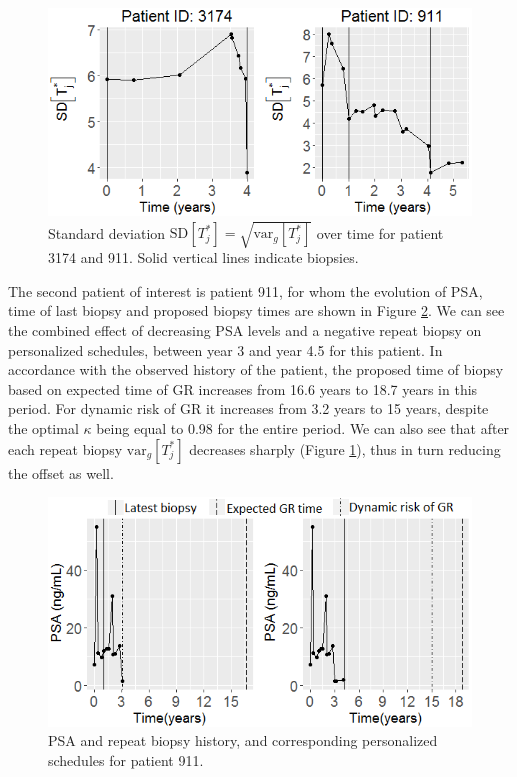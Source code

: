 \begin{figure}
\centerline{\includegraphics[width=\columnwidth]{images/prias_demo/variance_3174_911.png}}
\caption{Standard deviation $\mbox{SD}[T^*_j] = \sqrt{\mbox{var}_g[T^*_j]}$ over time for patient 3174 and 911. Solid vertical lines indicate biopsies.}
\label{fig : variance_pred_dist_3174_911}
\end{figure}

The second patient of interest is patient 911, for whom the evolution of PSA, time of last biopsy and proposed biopsy times are shown in Figure \ref{fig : prias_demo_pid_911}. We can see the combined effect of decreasing PSA levels and a negative repeat biopsy on personalized schedules, between year 3 and year 4.5 for this patient. In accordance with the observed history of the patient, the proposed time of biopsy based on expected time of GR increases from 16.6 years to 18.7 years in this period. For dynamic risk of GR it increases from 3.2 years to 15 years, despite the optimal $\kappa$ being equal to 0.98 for the entire period. We can also see that after each repeat biopsy $\mbox{var}_g[T^*_j]$ decreases sharply (Figure \ref{fig : variance_pred_dist_3174_911}), thus in turn reducing the offset as well.

\begin{figure}
\centerline{
\includegraphics[width=\columnwidth]{images/prias_demo/case_911.png}
}
\caption{PSA and repeat biopsy history, and corresponding personalized schedules for patient 911.}
\label{fig : prias_demo_pid_911}
\end{figure}

